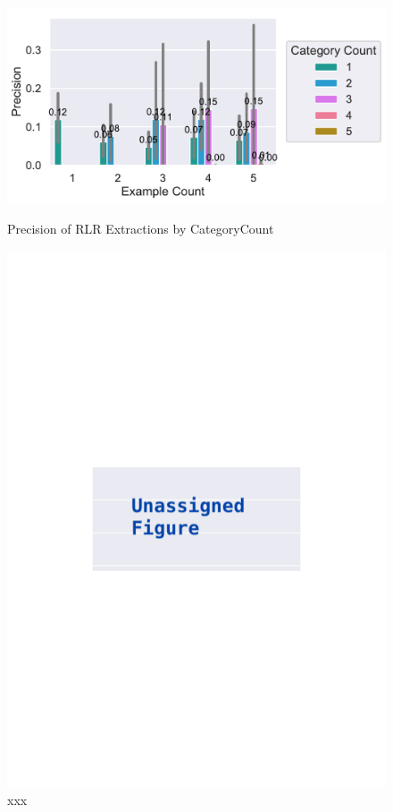 \documentclass[\myrootdir/main.tex]{subfiles}
\begin{document}
\begin{figure}[htbp]
	\centering
	\begin{minipage}{0.45\textwidth}
		\centering
		\includegraphics[width=\textwidth, clip]{img/big-study/precision-categorycount-examplecount-RLR.pdf}
		\caption{Precision of RLR Extractions by CategoryCount}
		\label{fig:precision-categorycount-examplecount-rlr}
	\end{minipage}\hfill
	\begin{minipage}{0.45\textwidth}
		\centering
		\includegraphics[width=\textwidth, clip]{img/big-study/xxx.pdf}
		\caption{xxx}
		\label{fig:xxx}
	\end{minipage}
\end{figure}
\end{document}
